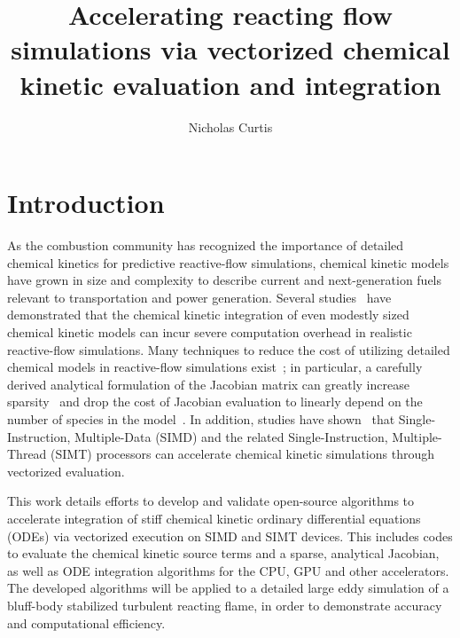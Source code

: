 \documentclass[a4paper,10pt]{article}
\title{Accelerating reacting flow simulations via vectorized chemical kinetic evaluation and integration}
\author{Nicholas Curtis}
\begin{document}
\maketitle

\section*{Introduction}
As the combustion community has recognized the importance of detailed chemical kinetics for predictive reactive-flow simulations, chemical kinetic models have grown in size and complexity to describe current and next-generation fuels relevant to transportation and power generation.
Several studies~\cite{Huang20091814,Bottone2012,Moiz2016123} have demonstrated that the chemical kinetic integration of even modestly sized chemical kinetic models can incur severe computation overhead in realistic reactive-flow simulations.
Many techniques to reduce the cost of utilizing detailed chemical models in reactive-flow simulations exist~\cite{LU2009192}; in particular, a carefully derived analytical formulation of the Jacobian matrix can greatly increase sparsity~\cite{SCHWER2002270} and drop the cost of Jacobian evaluation to linearly depend on the number of species in the model~\cite{LU2009192}.
In addition, studies have shown~\cite{STONE201818} that Single-Instruction, Multiple-Data (SIMD) and the related Single-Instruction, Multiple-Thread (SIMT) processors can accelerate chemical kinetic simulations through vectorized evaluation.

This work details efforts to develop and validate open-source algorithms to accelerate integration of stiff chemical kinetic ordinary differential equations (ODEs) via vectorized execution on SIMD and SIMT devices.
This includes codes to evaluate the chemical kinetic source terms and a sparse, analytical Jacobian, as well as ODE integration algorithms for the CPU, GPU and other accelerators.
The developed algorithms will be applied to a detailed large eddy simulation of a bluff-body stabilized turbulent reacting flame, in order to demonstrate accuracy and computational efficiency.
\end{document}
